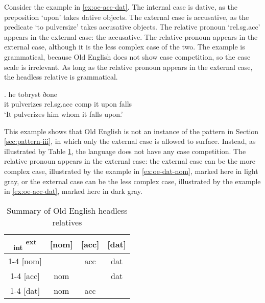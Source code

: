 Consider the example in \ref{ex:oe-acc-dat}.
The internal case is dative, as the preposition  `upon' takes dative objects.
The external case is accusative, as the predicate  `to pulversize' takes accusative objects.
The relative pronoun  `\ac{rel}.\ac{sg}.\ac{acc}' appears in the external case: the accusative.
The relative pronoun appears in the external case, although it is the less complex case of the two. The example is grammatical, because Old English does not show case competition, so the case scale is irrelevant. As long as the relative pronoun appears in the external case, the headless relative is grammatical.

\exg. he tobryst ðone    \\
 it pulverizes\scsub{[acc]} \ac{rel}.\ac{sg}.\ac{acc} \ac{comp} it upon\scsub{[dat]} falls\\
`It pulverizes him whom it falls upon.'  \label{ex:oe-acc-dat}

This example shows that Old English is not an instance of the pattern in Section \ref{sec:pattern-iii}, in which only the external case is allowed to surface. Instead, as illustrated by Table \ref{tbl:no-case-competition-old-english}, the language does not have any case competition. The relative pronoun appears in the external case: the external case can be the more complex case, illustrated by the example in \ref{ex:oe-dat-nom}, marked here in light gray, or the external case can be the less complex case, illustrated by the example in \ref{ex:oe-acc-dat}, marked here in dark gray.

\begin{table}[H]
  \center
  \caption{Summary of Old English headless relatives}
  \begin{tabular}{c|c|c|c}
    \toprule
   \textsubscript{\ac{int}} \textsuperscript{\ac{ext}}
          & [\ac{nom}]
          & [\ac{acc}]
          & [\ac{dat}]
          \\ \cmidrule{1-4}
      [\ac{nom}]
          & \xcancel{\phantom{xx}}
          & \ac{acc}
          & \cellcolor{LG}\ac{dat}
          \\ \cmidrule{1-4}
      [\ac{acc}]
          & \ac{nom}
          & \xcancel{\phantom{xx}}
          & \ac{dat}
          \\ \cmidrule{1-4}
      [\ac{dat}]
          & \ac{nom}
          & \cellcolor{DG}\ac{acc}
          & \xcancel{\phantom{xx}}
          \\
    \bottomrule
  \end{tabular}
  \label{tbl:no-case-competition-old-english}
\end{table}

